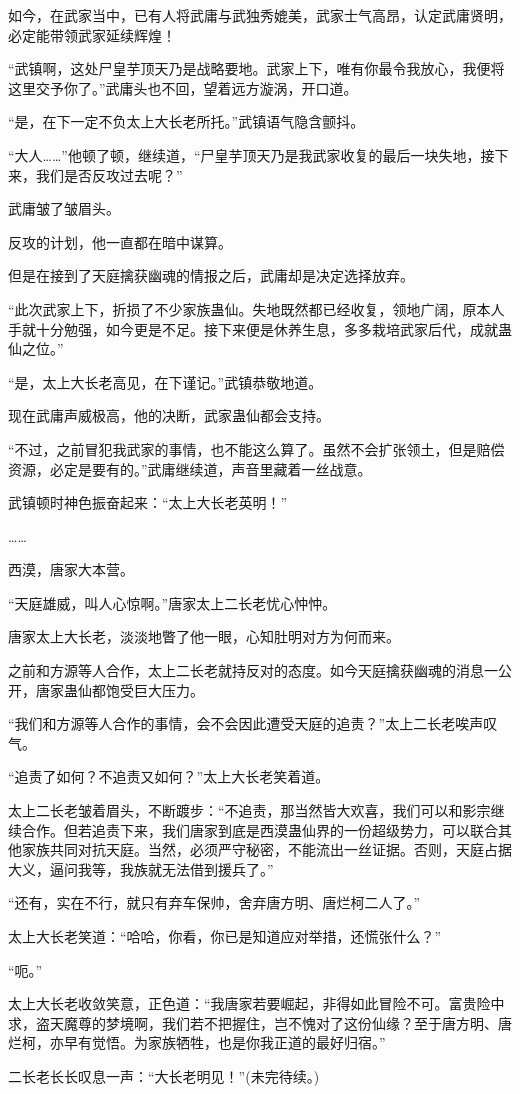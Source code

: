 \begin{this_body}
如今，在武家当中，已有人将武庸与武独秀媲美，武家士气高昂，认定武庸贤明，必定能带领武家延续辉煌！

“武镇啊，这处尸皇芋顶天乃是战略要地。武家上下，唯有你最令我放心，我便将这里交予你了。”武庸头也不回，望着远方漩涡，开口道。

“是，在下一定不负太上大长老所托。”武镇语气隐含颤抖。

“大人……”他顿了顿，继续道，“尸皇芋顶天乃是我武家收复的最后一块失地，接下来，我们是否反攻过去呢？”

武庸皱了皱眉头。

反攻的计划，他一直都在暗中谋算。

但是在接到了天庭擒获幽魂的情报之后，武庸却是决定选择放弃。

“此次武家上下，折损了不少家族蛊仙。失地既然都已经收复，领地广阔，原本人手就十分勉强，如今更是不足。接下来便是休养生息，多多栽培武家后代，成就蛊仙之位。”

“是，太上大长老高见，在下谨记。”武镇恭敬地道。

现在武庸声威极高，他的决断，武家蛊仙都会支持。

“不过，之前冒犯我武家的事情，也不能这么算了。虽然不会扩张领土，但是赔偿资源，必定是要有的。”武庸继续道，声音里藏着一丝战意。

武镇顿时神色振奋起来：“太上大长老英明！”

……

西漠，唐家大本营。

“天庭雄威，叫人心惊啊。”唐家太上二长老忧心忡忡。

唐家太上大长老，淡淡地瞥了他一眼，心知肚明对方为何而来。

之前和方源等人合作，太上二长老就持反对的态度。如今天庭擒获幽魂的消息一公开，唐家蛊仙都饱受巨大压力。

“我们和方源等人合作的事情，会不会因此遭受天庭的追责？”太上二长老唉声叹气。

“追责了如何？不追责又如何？”太上大长老笑着道。

太上二长老皱着眉头，不断踱步：“不追责，那当然皆大欢喜，我们可以和影宗继续合作。但若追责下来，我们唐家到底是西漠蛊仙界的一份超级势力，可以联合其他家族共同对抗天庭。当然，必须严守秘密，不能流出一丝证据。否则，天庭占据大义，逼问我等，我族就无法借到援兵了。”

“还有，实在不行，就只有弃车保帅，舍弃唐方明、唐烂柯二人了。”

太上大长老笑道：“哈哈，你看，你已是知道应对举措，还慌张什么？”

“呃。”

太上大长老收敛笑意，正色道：“我唐家若要崛起，非得如此冒险不可。富贵险中求，盗天魔尊的梦境啊，我们若不把握住，岂不愧对了这份仙缘？至于唐方明、唐烂柯，亦早有觉悟。为家族牺牲，也是你我正道的最好归宿。”

二长老长长叹息一声：“大长老明见！”(未完待续。)

\end{this_body}

